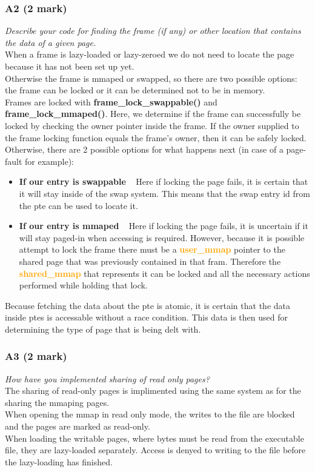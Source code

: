 \documentclass{report}
\newcommand{\question}[1]{\textit{#1} \ }
\newcommand{\bullpara}[2]{\item \textbf{#1} \ #2}
\newcommand{\fun}[1]{\textcolor{Emerald}{\textbf{#1}}}
\newcommand{\struct}[1]{\textcolor{orange}{\textbf{#1}}}
\newcommand{\compitem}[1]{\begin{itemize}\setlength\itemsep{-0.5em}#1\end{itemize}}
\begin{document}
			\subsubsection*{A2 (2 mark)}
				\question{Describe your code for finding the frame (if any) or 
				other location that contains the data of a given page.} 
				\\
				When a frame is lazy-loaded or lazy-zeroed we do not need 
				to locate the page because it has not been set up yet. \\
				Otherwise the frame is mmaped or swapped, so there are two 
				possible options: the frame can be locked or it can be 
				determined not to be in memory. \\
				Frames are locked with \fun{frame\_lock\_swappable()} and 
				\fun{frame\_lock\_mmaped()}. Here, we determine if the frame can
				successfully be locked by checking the owner pointer inside the 
				frame. If the owner supplied to the frame locking function 
				equals the frame's owner, then it can be safely locked.
				Otherwise, there are 2 possible options for what happens 
				next (in case of a page-fault for example):
				\compitem{
					\bullpara{If our entry is swappable}{
						Here if locking the page fails, it is certain that
						it will stay inside of the swap system. This means that
						the swap entry id from the pte can be used to locate it.
					}
					\bullpara{If our entry is mmaped}{
						Here if locking the page fails, it is uncertain
						if it will stay paged-in when accessing is required. 
						However, because it is possible attempt to lock the
						frame there must be a \struct{user\_mmap} pointer
						to the shared page that was previously contained in that fram.
						Therefore the \struct{shared\_mmap} that represents it can be locked
						and all the necessary actions performed while holding that lock.
					}
				}
				Because fetching the data about the pte is atomic,
				it is certain that the data inside ptes is accessable without a 
				race condition. This data is then used for determining the type 
				of page that is being delt with.

			\subsubsection*{A3 (2 mark)}
				\question{How have you implemented sharing of read only pages?}
				\\ The sharing of read-only pages is implimented using the same
				system as for the sharing the mmaping pages.
				\\ When opening the mmap in read only mode, the writes to the 
				file are blocked and the pages are marked as read-only.
				\\ When loading the writable pages, where bytes must be read from 
				the executable file, they are lazy-loaded separately. Access is 
				denyed to writing to the file before the lazy-loading has 
				finished.
			
\end{document}
